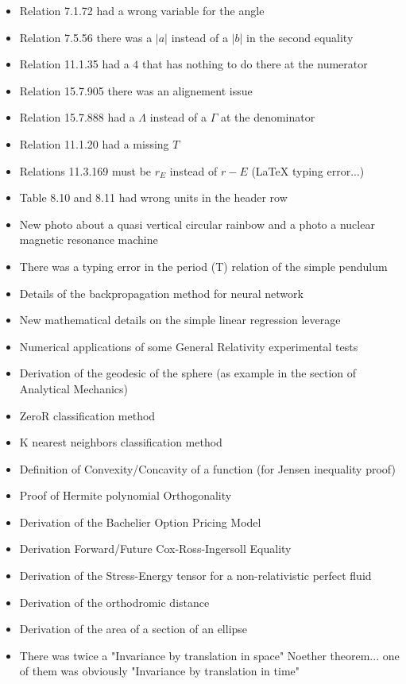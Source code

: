 \documentclass[12pt,a4paper,twoside,openright]{report}
\theoremstyle{definition}
\theoremstyle{itexmp}
\numberwithin{equation}{section}
\begin{document}
\begin{itemize}
\begin{itemize}[noitemsep]
				\item Relation 7.1.72 had a wrong variable for the angle
				\item Relation 7.5.56 there was a $|a|$ instead of a $|b|$ in the second equality
				\item Relation 11.1.35 had a $4$ that has nothing to do there at the numerator
				\item Relation 15.7.905 there was an alignement issue
				\item Relation 15.7.888 had a $\Lambda$ instead of a $\Gamma$ at the denominator
				\item Relation 11.1.20 had a missing $T$
				\item Relations 11.3.169 must be $r_E$ instead of $r-E$ (LaTeX typing error...)
				\item Table 8.10 and 8.11 had wrong units in the header row
				\item New photo about a quasi vertical circular rainbow and a photo a nuclear magnetic resonance machine
				\item There was a typing error in the period (T) relation of the simple pendulum
				\item Details of the backpropagation method for neural network
				\item New mathematical details on the simple linear regression leverage
				\item Numerical applications of some General Relativity experimental tests
				\item Derivation of the geodesic of the sphere (as example in the section of Analytical Mechanics)
				\item ZeroR classification method
				\item K nearest neighbors classification method
				\item Definition of Convexity/Concavity of a function (for Jensen inequality proof)
				\item Proof of  Hermite polynomial Orthogonality
				\item Derivation of the Bachelier Option Pricing Model
				\item Derivation Forward/Future Cox-Ross-Ingersoll Equality
				\item Derivation of the Stress-Energy tensor for a non-relativistic perfect fluid
				\item Derivation of the orthodromic distance
				\item Derivation of the area of a section of an ellipse
				\item There was twice a "Invariance by translation in space" Noether theorem... one of them was obviously "Invariance by translation in time"

\end{itemize}
\end{itemize}
\end{document}
